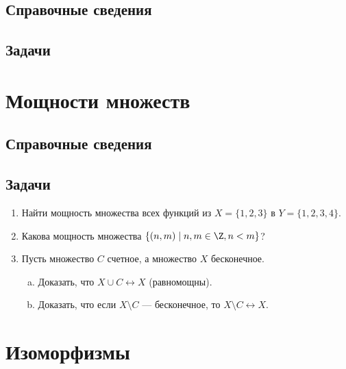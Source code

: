 \subsection*{Справочные сведения}

\subsection*{Задачи}




\begin{comment}
\chapter{15. Континуум}
\end{comment}


\section{Мощности множеств}\label{powers}

\subsection*{Справочные сведения}

\subsection*{Задачи}

\begin{enumerate}
\item Найти мощность множества всех функций из $X=\{1,2,3\}$ в $Y=\{1,2,3,4\}$.
\item Какова мощность множества $\{(n,m)\mid n,m\in\Z, n<m\}$?
\item Пусть множество $C$ счетное, а множество $X$ бесконечное.
\begin{enumerate}[a)]
\item Доказать, что $X\cup C\leftrightarrow X$ (равномощны).
\item Доказать, что если $X\setminus C$ --- бесконечное, то $X\setminus C\leftrightarrow X$.
\end{enumerate}
\end{enumerate}

\section{Изоморфизмы}

